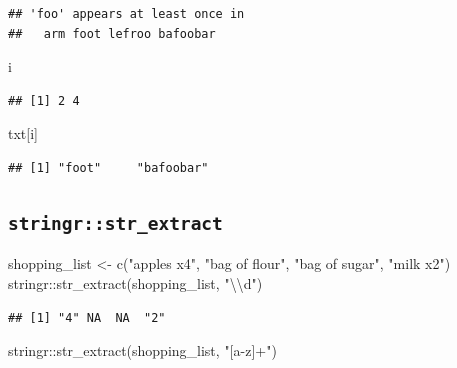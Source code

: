 \documentclass[
]{article}
\newenvironment{Shaded}{\begin{snugshade}}{\end{snugshade}}
\newcommand{\FunctionTok}[1]{\textcolor[rgb]{0.00,0.00,0.00}{#1}}
\newcommand{\NormalTok}[1]{#1}
\newcommand{\OtherTok}[1]{\textcolor[rgb]{0.56,0.35,0.01}{#1}}
\newcommand{\SpecialCharTok}[1]{\textcolor[rgb]{0.00,0.00,0.00}{#1}}
\newcommand{\StringTok}[1]{\textcolor[rgb]{0.31,0.60,0.02}{#1}}
\begin{document}
\begin{verbatim}
## 'foo' appears at least once in
##   arm foot lefroo bafoobar
\end{verbatim}

\begin{Shaded}
\begin{Highlighting}[]
\NormalTok{i}
\end{Highlighting}
\end{Shaded}

\begin{verbatim}
## [1] 2 4
\end{verbatim}

\begin{Shaded}
\begin{Highlighting}[]
\NormalTok{txt[i]}
\end{Highlighting}
\end{Shaded}

\begin{verbatim}
## [1] "foot"     "bafoobar"
\end{verbatim}

\hypertarget{stringrstr_extract}{%
\subsection{\texorpdfstring{\texttt{stringr::str\_extract}}{stringr::str\_extract}}\label{stringrstr_extract}}

\begin{Shaded}
\begin{Highlighting}[]
\NormalTok{shopping\_list }\OtherTok{\textless{}{-}} \FunctionTok{c}\NormalTok{(}\StringTok{"apples x4"}\NormalTok{, }\StringTok{"bag of flour"}\NormalTok{, }\StringTok{"bag of sugar"}\NormalTok{, }\StringTok{"milk x2"}\NormalTok{)}
\NormalTok{stringr}\SpecialCharTok{::}\FunctionTok{str\_extract}\NormalTok{(shopping\_list, }\StringTok{"}\SpecialCharTok{\textbackslash{}\textbackslash{}}\StringTok{d"}\NormalTok{)}
\end{Highlighting}
\end{Shaded}

\begin{verbatim}
## [1] "4" NA  NA  "2"
\end{verbatim}

\begin{Shaded}
\begin{Highlighting}[]
\NormalTok{stringr}\SpecialCharTok{::}\FunctionTok{str\_extract}\NormalTok{(shopping\_list, }\StringTok{"[a{-}z]+"}\NormalTok{)}
\end{Highlighting}
\end{Shaded}
\end{document}
